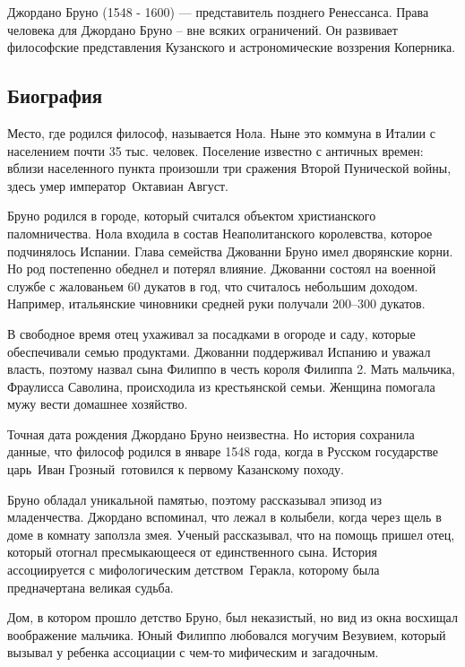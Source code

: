 \documentclass[
]{article}
\begin{document}
Джордано Бруно (1548 - 1600) --- представитель позднего Ренессанса.
Права человека для Джордано Бруно -- вне всяких ограничений. Он
развивает философские представления Кузанского и астрономические
воззрения Коперника.

\hypertarget{ux431ux438ux43eux433ux440ux430ux444ux438ux44f-1}{%
\subsection{Биография}\label{ux431ux438ux43eux433ux440ux430ux444ux438ux44f-1}}

Место, где родился философ, называется Нола. Ныне это коммуна в Италии с
населением почти 35 тыс. человек. Поселение известно с античных времен:
вблизи населенного пункта произошли три сражения Второй Пунической
войны, здесь умер император~Октавиан Август.

Бруно родился в городе, который считался объектом христианского
паломничества. Нола входила в состав Неаполитанского королевства,
которое подчинялось Испании. Глава семейства Джованни Бруно имел
дворянские корни. Но род постепенно обеднел и потерял влияние. Джованни
состоял на военной службе с жалованьем 60 дукатов в год, что считалось
небольшим доходом. Например, итальянские чиновники средней руки получали
200--300 дукатов.

В свободное время отец ухаживал за посадками в огороде и саду, которые
обеспечивали семью продуктами. Джованни поддерживал Испанию и уважал
власть, поэтому назвал сына Филиппо в честь короля Филиппа 2. Мать
мальчика, Фраулисса Саволина, происходила из крестьянской семьи. Женщина
помогала мужу вести домашнее хозяйство.

Точная дата рождения Джордано Бруно неизвестна. Но история сохранила
данные, что философ родился в январе 1548 года, когда в Русском
государстве царь~Иван Грозный~готовился к первому Казанскому походу.

Бруно обладал уникальной памятью, поэтому рассказывал эпизод из
младенчества. Джордано вспоминал, что лежал в колыбели, когда через щель
в доме в комнату заползла змея. Ученый рассказывал, что на помощь пришел
отец, который отогнал пресмыкающееся от единственного сына. История
ассоциируется с мифологическим детством~Геракла, которому была
предначертана великая судьба.

Дом, в котором прошло детство Бруно, был неказистый, но вид из окна
восхищал воображение мальчика. Юный Филиппо любовался могучим Везувием,
который вызывал у ребенка ассоциации с чем-то мифическим и загадочным.
\end{document}
